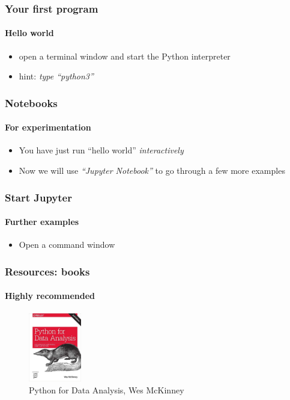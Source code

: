 \documentclass{beamer}
\begin{document}
    \begin{frame}
	    \frametitle{Your first program}
	    \framesubtitle{Hello world}

	    \begin{itemize}
		    \item open a terminal window and start the Python interpreter
		    \item hint: \textit{type ``python3''}
	    \end{itemize}
	    \lstB
	    \lstC
    \end{frame}


    \begin{frame}
	    \frametitle{Notebooks}
	    \framesubtitle{For experimentation}

	    \begin{itemize}
		    \item You have just run ``hello world'' \textit{interactively}
		    \item Now we will use \textit{``Jupyter Notebook''} to go through a few more examples
	    \end{itemize}
    \end{frame}



    \begin{frame}
	    \frametitle{Start Jupyter}
	    \framesubtitle{Further examples}

	    \begin{itemize}
		    \item Open a command window
	    \end{itemize}
	    \lstC

    \end{frame}



       \begin{frame}
	       \frametitle{Resources: books}
	       \framesubtitle{Highly recommended}
	       \begin{figure}
		       \includegraphics[height=3cm]{images/recommended_book.jpg}
		       \caption{Python for Data Analysis, Wes McKinney}
		       \label{fig:pythonbook}
	       \end{figure}
       \end{frame}
\end{document}
